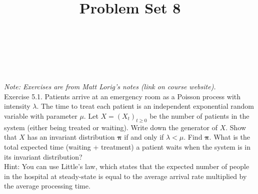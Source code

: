 \documentclass[10pt]{amsart}
\begin{document}
\noindent
{} \\
 \\
 \\
\title{Problem Set 8}
\maketitle

{\it Note: Exercises are from Matt Lorig's notes (link on course website).} \\

 Exercise 5.1.
Patients arrive at an emergency room as a Poisson process with intensity $\lambda$.
The time to treat each patient is an independent exponential random variable with parameter $\mu$.
Let $X = (X_t)_{t \geq 0}$ be the number of patients in the system (either being treated or waiting).
Write down the generator of $X$.
Show that $X$ has an invariant distribution $\bm \pi $ if and only if $\lambda < \mu$.
Find $\bm \pi $.
What is the total expected time (waiting + treatment) a patient waits when the system is in its invariant distribution? \\

\noindent
Hint: You can use Little's law, which states that the expected number of people in the hospital at steady-state is equal to the average arrival rate multiplied by the average processing time. \\
\end{document}
